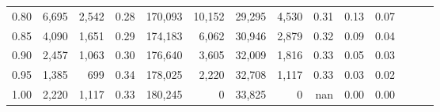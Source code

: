 \begin{tabular}{rrrrrrrrrrrrrr}
0.80 &   6,695 &  2,542 &  0.28 &  170,093 &   10,152 &  29,295 &   4,530 &  0.31 &  0.13 &      0.07 \\
0.85 &   4,090 &  1,651 &  0.29 &  174,183 &    6,062 &  30,946 &   2,879 &  0.32 &  0.09 &      0.04 \\
0.90 &   2,457 &  1,063 &  0.30 &  176,640 &    3,605 &  32,009 &   1,816 &  0.33 &  0.05 &      0.03 \\
0.95 &   1,385 &    699 &  0.34 &  178,025 &    2,220 &  32,708 &   1,117 &  0.33 &  0.03 &      0.02 \\
1.00 &   2,220 &  1,117 &  0.33 &  180,245 &        0 &  33,825 &       0 &   nan &  0.00 &      0.00 \\
\bottomrule
\end{tabular}
